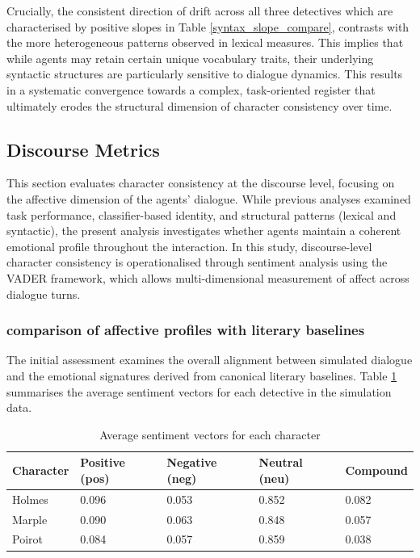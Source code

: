 \documentclass{article}
\begin{document}
Crucially, the consistent direction of drift across all three detectives which are characterised by positive slopes in Table \ref{syntax_slope_compare}, contrasts with the more heterogeneous patterns observed in lexical measures. This implies that while agents may retain certain unique vocabulary traits, their underlying syntactic structures are particularly sensitive to dialogue dynamics. This results in a systematic convergence towards a complex, task-oriented register that ultimately erodes the structural dimension of character consistency over time.

\subsection{Discourse Metrics}

This section evaluates character consistency at the discourse level, focusing on the affective dimension of the agents’ dialogue. While previous analyses examined task performance, classifier-based identity, and structural patterns (lexical and syntactic), the present analysis investigates whether agents maintain a coherent emotional profile throughout the interaction. In this study, discourse-level character consistency is operationalised through sentiment analysis using the VADER framework, which allows multi-dimensional measurement of affect across dialogue turns.

\subsubsection{comparison of affective profiles with literary baselines}

The initial assessment examines the overall alignment between simulated dialogue and the emotional signatures derived from canonical literary baselines. Table \ref{sentiment_avg} summarises the average sentiment vectors for each detective in the simulation data.

\begin{table}[H]
\centering
\begin{tabular}{l l l l l}\toprule
Character & Positive (pos) & Negative (neg) & Neutral (neu) & Compound \\\midrule
Holmes & 0.096 & 0.053 & 0.852 & 0.082 \\
Marple & 0.090 & 0.063 & 0.848 & 0.057 \\
Poirot & 0.084 & 0.057 & 0.859 & 0.038 \\ \bottomrule
\end{tabular}
\caption{Average sentiment vectors for each character}
\label{sentiment_avg}
\end{table}
\end{document}
